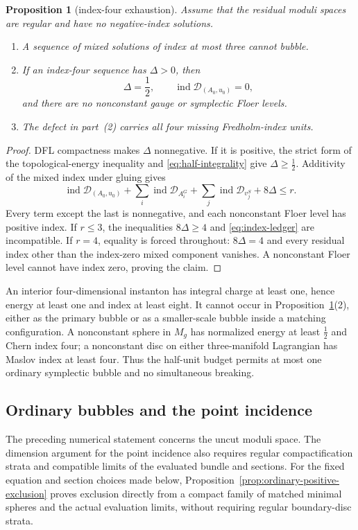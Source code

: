 \documentclass[11pt]{amsart}
\newtheorem{proposition}[theorem]{Proposition}
\theoremstyle{definition}
\theoremstyle{remark}
\theoremstyle{plain}
\newcommand{\cD}{\mathcal{D}}
\newcommand{\ind}{\operatorname{ind}}
\begin{document}
\begin{proposition}[index-four exhaustion]\label{prop:index-exhaustion}
Assume that the residual moduli spaces are regular and have no
negative-index solutions.
\begin{enumerate}
\item A sequence of mixed solutions of index at most three cannot bubble.
\item If an index-four sequence has $\Delta>0$, then
\begin{equation}\label{eq:exhaustion}
 \Delta=\frac12,\qquad
 \ind\cD_{(A_0,u_0)}=0,
\end{equation}
and there are no nonconstant gauge or symplectic Floer levels.
\item The defect in part~(2) carries all four missing Fredholm-index
units.
\end{enumerate}
\end{proposition}

\begin{proof}
DFL compactness makes $\Delta$ nonnegative.  If it is positive, the
strict form of the topological-energy inequality and
\eqref{eq:half-integrality} give $\Delta\geq\frac12$.  Additivity of the
mixed index under gluing gives
\begin{equation}\label{eq:index-ledger}
 \ind\cD_{(A_0,u_0)}+
 \sum_i\ind\cD_{A_i^G}+
 \sum_j\ind\cD_{v_j^S}+8\Delta\leq r.
\end{equation}
Every term except the last is nonnegative, and each nonconstant Floer
level has positive index.  If $r\leq3$, the inequalities
$8\Delta\geq4$ and \eqref{eq:index-ledger} are incompatible.  If $r=4$,
equality is forced throughout: $8\Delta=4$ and every residual index other
than the index-zero mixed component vanishes.  A nonconstant Floer level
cannot have index zero, proving the claim.
\end{proof}

An interior four-dimensional instanton has integral charge at least one,
hence energy at least one and index at least eight.  It cannot occur in
Proposition~\ref{prop:index-exhaustion}(2), either as the primary bubble or
as a smaller-scale bubble inside a matching configuration.  A
nonconstant sphere in $M_g$ has normalized energy at least $\frac12$ and
Chern index four; a nonconstant disc on either three-manifold Lagrangian
has Maslov index at least four.  Thus the half-unit budget permits at most
one ordinary symplectic bubble and no simultaneous breaking.

\subsection{Ordinary bubbles and the point incidence}
\label{sec:ordinary-bubbles}
The preceding numerical statement concerns the uncut moduli space.
The dimension argument for the point incidence also requires regular
compactification strata and compatible limits of the evaluated bundle
and sections.
For the fixed equation and section choices made below,
Proposition~\ref{prop:ordinary-positive-exclusion} proves exclusion
directly from a compact family of matched minimal spheres and the
actual evaluation limits, without requiring regular boundary-disc
strata.
\end{document}
